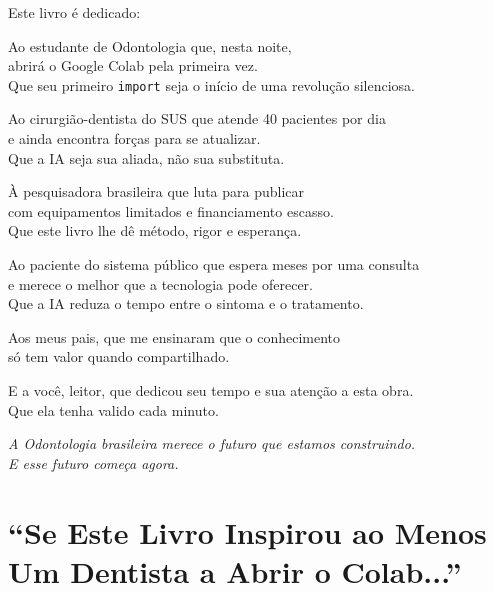 \nivelzero

\begin{center}
\itshape

\bigskip

Este livro é dedicado:

\medskip

Ao estudante de Odontologia que, nesta noite, \\
abrirá o Google Colab pela primeira vez. \\
Que seu primeiro \texttt{import} seja o início de uma revolução silenciosa.

\medskip

Ao cirurgião-dentista do SUS que atende 40 pacientes por dia \\
e ainda encontra forças para se atualizar. \\
Que a IA seja sua aliada, não sua substituta.

\medskip

À pesquisadora brasileira que luta para publicar \\
com equipamentos limitados e financiamento escasso. \\
Que este livro lhe dê método, rigor e esperança.

\medskip

Ao paciente do sistema público que espera meses por uma consulta \\
e merece o melhor que a tecnologia pode oferecer. \\
Que a IA reduza o tempo entre o sintoma e o tratamento.

\medskip

Aos meus pais, que me ensinaram que o conhecimento \\
só tem valor quando compartilhado.

\medskip

E a você, leitor, que dedicou seu tempo e sua atenção a esta obra. \\
Que ela tenha valido cada minuto.

\bigskip

\textit{A Odontologia brasileira merece o futuro que estamos construindo.} \\
\textit{E esse futuro começa agora.}

\end{center}

\section{``Se Este Livro Inspirou ao Menos Um Dentista a Abrir o Colab...''}
\label{sec:fecho}

